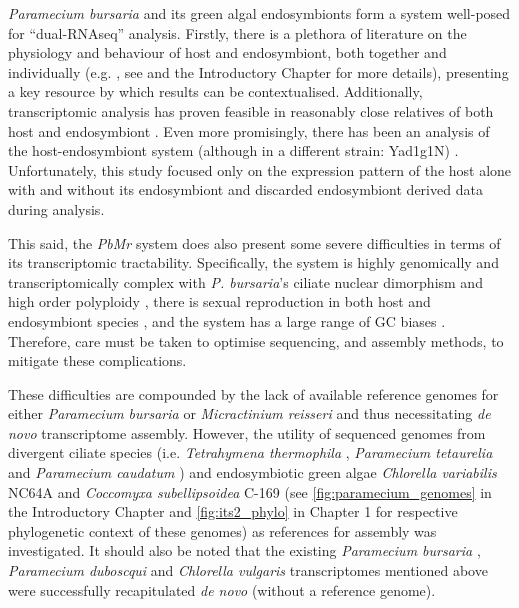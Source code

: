 \textit{Paramecium bursaria} and its green algal endosymbionts form a system well-posed
for ``dual-RNAseq'' analysis.  Firstly, there is a plethora 
of literature on the physiology and behaviour of host and endosymbiont, both together and individually
(e.g. \citep{Iwatsuki1988}, see \citep{Kato2009a} and the Introductory Chapter for more details), presenting 
a key resource by which results can be contextualised.
Additionally, transcriptomic analysis has proven feasible in reasonably close relatives of both host \citep{Arnaiz2010,Kolisko2014} and endosymbiont \citep{Guarnieri2011,Rowe2014,Bashan2015}.  
Even more promisingly, there has been an analysis of the host-endosymbiont
system (although in a different strain: Yad1g1N) \citep{Kodama2014}. 
Unfortunately, this study focused only on the expression pattern of the host
alone with and without its endosymbiont and discarded endosymbiont derived data
during analysis.


This said, the \textit{PbMr} system does also present some severe difficulties in terms of its transcriptomic tractability.
Specifically, the system is highly genomically and transcriptomically complex with \textit{P. bursaria}'s ciliate nuclear
dimorphism and high order polyploidy \citep{Raikov1995}, 
there is sexual reproduction in both host \citep{Jennings1939} and endosymbiont species \citep{Blanc2010},
and the system has a large range of GC biases \citep{Kodama2014}. Therefore, care must be taken to optimise sequencing,
and assembly methods, to mitigate these complications.


These difficulties are compounded by the lack of available reference genomes for either \textit{Paramecium bursaria} or \textit{Micractinium reisseri} and thus necessitating \textit{de novo} transcriptome assembly.
However, the utility of sequenced genomes from divergent ciliate species 
(i.e. \textit{Tetrahymena thermophila} \citep{Eisen2006}, \textit{Paramecium tetaurelia} \citep{Aury2006} and \textit{Paramecium caudatum}
\citep{McGrath2014}) and endosymbiotic green algae \textit{Chlorella variabilis} NC64A \citep{Blanc2010} and \textit{Coccomyxa subellipsoidea} C-169 \citep{Blanc2012}
(see \cref{fig:paramecium_genomes} in the Introductory Chapter and \cref{fig:its2_phylo} in Chapter 1 for respective phylogenetic context of these genomes) as references for assembly was investigated.
It should also be noted that the existing \textit{Paramecium bursaria} \citep{Kodama2014}, 
\textit{Paramecium duboscqui} \citep{Kolisko2014} and
\textit{Chlorella vulgaris} \citep{Guarnieri2011} transcriptomes mentioned above were
successfully recapitulated \textit{de novo} (without a reference genome).


